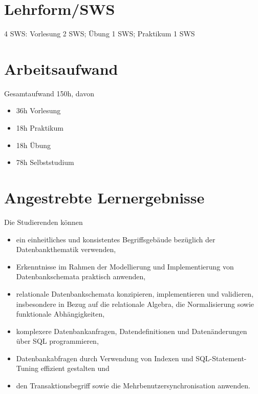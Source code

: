 \hypertarget{lehrformswspathlabelmi-2017modulbeschreibungen-bachelorba_datenbanken1}{%
\section*{Lehrform/SWS\label{/mi-2017/modulbeschreibungen-bachelor/BA_Datenbanken1}}\label{lehrformswspathlabelmi-2017modulbeschreibungen-bachelorba_datenbanken1}}

4 SWS: Vorlesung 2 SWS; Übung 1 SWS; Praktikum 1 SWS

\hypertarget{arbeitsaufwandpathlabelmi-2017modulbeschreibungen-bachelorba_datenbanken1}{%
\section*{Arbeitsaufwand\label{/mi-2017/modulbeschreibungen-bachelor/BA_Datenbanken1}}\label{arbeitsaufwandpathlabelmi-2017modulbeschreibungen-bachelorba_datenbanken1}}

Gesamtaufwand 150h, davon

\begin{itemize}
\tightlist
\item
  36h Vorlesung
\item
  18h Praktikum
\item
  18h Übung
\item
  78h Selbststudium
\end{itemize}

\hypertarget{angestrebte-lernergebnissepathlabelmi-2017modulbeschreibungen-bachelorba_datenbanken1}{%
\section*{Angestrebte
Lernergebnisse\label{/mi-2017/modulbeschreibungen-bachelor/BA_Datenbanken1}}\label{angestrebte-lernergebnissepathlabelmi-2017modulbeschreibungen-bachelorba_datenbanken1}}

Die Studierenden können

\begin{itemize}
\tightlist
\item
  ein einheitliches und konsistentes Begriffsgebäude bezüglich der
  Datenbankthematik verwenden,
\item
  Erkenntnisse im Rahmen der Modellierung und Implementierung von
  Datenbankschemata praktisch anwenden,
\item
  relationale Datenbankschemata konzipieren, implementieren und
  validieren, insbesondere in Bezug auf die relationale Algebra, die
  Normalisierung sowie funktionale Abhängigkeiten,
\item
  komplexere Datenbankanfragen, Datendefinitionen und Datenänderungen
  über SQL programmieren,~
\item
  Datenbankabfragen durch Verwendung von Indexen und
  SQL-Statement-Tuning effizient gestalten und
\item
  den Transaktionsbegriff sowie die Mehrbenutzersynchronisation
  anwenden.
\end{itemize}

